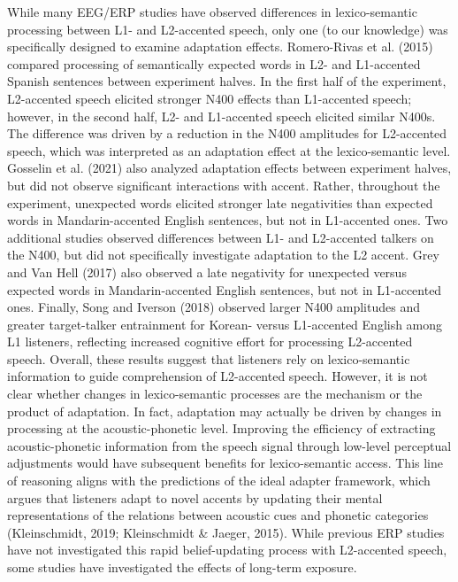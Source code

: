 \documentclass[
  12pt,
  twoside]{article}
\begin{document}
While many EEG/ERP studies have observed differences in lexico-semantic processing between L1- and L2-accented speech, only one (to our knowledge) was specifically designed to examine adaptation effects.
Romero-Rivas et al. (2015) compared processing of semantically expected words in L2- and L1-accented Spanish sentences between experiment halves.
In the first half of the experiment, L2-accented speech elicited stronger N400 effects than L1-accented speech; however, in the second half, L2- and L1-accented speech elicited similar N400s.
The difference was driven by a reduction in the N400 amplitudes for L2-accented speech, which was interpreted as an adaptation effect at the lexico-semantic level.
Gosselin et al. (2021) also analyzed adaptation effects between experiment halves, but did not observe significant interactions with accent.
Rather, throughout the experiment, unexpected words elicited stronger late negativities than expected words in Mandarin-accented English sentences, but not in L1-accented ones.
Two additional studies observed differences between L1- and L2-accented talkers on the N400, but did not specifically investigate adaptation to the L2 accent.
Grey and Van Hell (2017) also observed a late negativity for unexpected versus expected words in Mandarin-accented English sentences, but not in L1-accented ones.
Finally, Song and Iverson (2018) observed larger N400 amplitudes and greater target-talker entrainment for Korean- versus L1-accented English among L1 listeners, reflecting increased cognitive effort for processing L2-accented speech.
Overall, these results suggest that listeners rely on lexico-semantic information to guide comprehension of L2-accented speech.
However, it is not clear whether changes in lexico-semantic processes are the mechanism or the product of adaptation.
In fact, adaptation may actually be driven by changes in processing at the acoustic-phonetic level.
Improving the efficiency of extracting acoustic-phonetic information from the speech signal through low-level perceptual adjustments would have subsequent benefits for lexico-semantic access.
This line of reasoning aligns with the predictions of the ideal adapter framework, which argues that listeners adapt to novel accents by updating their mental representations of the relations between acoustic cues and phonetic categories (Kleinschmidt, 2019; Kleinschmidt \& Jaeger, 2015).
While previous ERP studies have not investigated this rapid belief-updating process with L2-accented speech, some studies have investigated the effects of long-term exposure.
\end{document}
